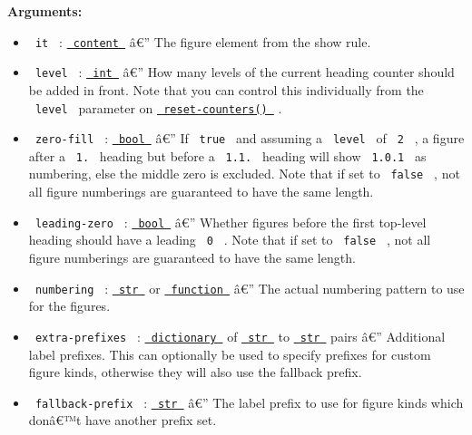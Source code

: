 \textbf{Arguments:}

\begin{itemize}
\tightlist
\item
  \texttt{\ it\ } :
  \href{https://typst.app/docs/reference/foundations/content/}{\texttt{\ content\ }}
  â€'' The figure element from the show rule.
\item
  \texttt{\ level\ } :
  \href{https://typst.app/docs/reference/foundations/int/}{\texttt{\ int\ }}
  â€'' How many levels of the current heading counter should be added in
  front. Note that you can control this individually from the
  \texttt{\ level\ } parameter on
  \href{https://github.com/typst/packages/raw/main/packages/preview/i-figured/0.2.4/\#reset-counters}{\texttt{\ reset-counters()\ }}
  .
\item
  \texttt{\ zero-fill\ } :
  \href{https://typst.app/docs/reference/foundations/bool/}{\texttt{\ bool\ }}
  â€'' If \texttt{\ true\ } and assuming a \texttt{\ level\ } of
  \texttt{\ 2\ } , a figure after a \texttt{\ 1.\ } heading but before a
  \texttt{\ 1.1.\ } heading will show \texttt{\ 1.0.1\ } as numbering,
  else the middle zero is excluded. Note that if set to
  \texttt{\ false\ } , not all figure numberings are guaranteed to have
  the same length.
\item
  \texttt{\ leading-zero\ } :
  \href{https://typst.app/docs/reference/foundations/bool/}{\texttt{\ bool\ }}
  â€'' Whether figures before the first top-level heading should have a
  leading \texttt{\ 0\ } . Note that if set to \texttt{\ false\ } , not
  all figure numberings are guaranteed to have the same length.
\item
  \texttt{\ numbering\ } :
  \href{https://typst.app/docs/reference/foundations/str/}{\texttt{\ str\ }}
  or
  \href{https://typst.app/docs/reference/foundations/function/}{\texttt{\ function\ }}
  â€'' The actual numbering pattern to use for the figures.
\item
  \texttt{\ extra-prefixes\ } :
  \href{https://typst.app/docs/reference/foundations/dictionary/}{\texttt{\ dictionary\ }}
  of
  \href{https://typst.app/docs/reference/foundations/str/}{\texttt{\ str\ }}
  to
  \href{https://typst.app/docs/reference/foundations/str/}{\texttt{\ str\ }}
  pairs â€'' Additional label prefixes. This can optionally be used to
  specify prefixes for custom figure kinds, otherwise they will also use
  the fallback prefix.
\item
  \texttt{\ fallback-prefix\ } :
  \href{https://typst.app/docs/reference/foundations/str/}{\texttt{\ str\ }}
  â€'' The label prefix to use for figure kinds which donâ€™t have
  another prefix set.
\end{itemize}

